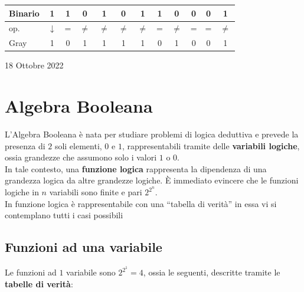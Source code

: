 \documentclass[a4paper]{extarticle}
\renewcommand\arraystretch{}
\begin{document}
\begin{itemize}
    \noindent
    \begin{table}[H]
    \setlength{\tabcolsep}{4pt}
    \renewcommand{\arraystretch}{1.2}
    \centering
    \begin{tabular}{|l|c|c|c|c|c|c|c|c|c|c|c|}
        \hline
        Binario & 1 & 1 & 0 & 1 & 0 & 1 & 1 & 0 & 0 & 0 & 1\\
        \hline
        op. & $\downarrow$ & = & $\neq$ & $\neq$ & $\neq$ & $\neq$ & = & $\neq$ & = & = & $\neq$\\
        \hline
        Gray & 1 & 0 & 1 & 1 & 1 & 1 & 0 & 1 & 0 & 0 & 1\\
        \hline
    \end{tabular}
    \end{table}
\end{itemize}

\newpage
\begin{center}
    18 Ottobre 2022
\end{center}
\section{Algebra Booleana}
L'Algebra Booleana è nata per studiare problemi di logica deduttiva e prevede la presenza di $2$ soli elementi, $0$ e $1$, rappresentabili tramite delle \textbf{variabili logiche}, ossia grandezze che assumono solo i valori $1$ o $0$.\\
In tale contesto, una \textbf{funzione logica} rappresenta la dipendenza di una grandezza logica da altre grandezze logiche. È immediato evincere che le funzioni logiche in $n$ variabili sono finite e pari $2^{2^n}$.\\
In funzione logica è rappresentabile con una “tabella di verità” in essa vi si contemplano tutti i casi possibili

\vspace{1em}
\subsection{Funzioni ad una variabile}
Le funzioni ad $1$ variabile sono $2^{2^1}=4$, ossia le seguenti, descritte tramite le \textbf{tabelle di verità}:
\end{document}
